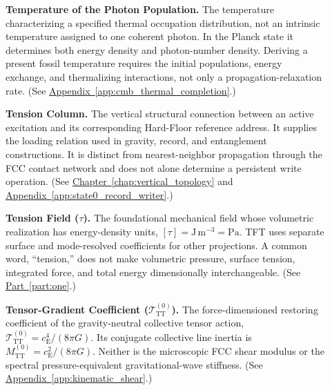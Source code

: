 \begin{description}
\item[] \begin{minipage}[t]{\linewidth}
\textbf{Temperature of the Photon Population.} The temperature characterizing a specified thermal occupation distribution, not an intrinsic temperature assigned to one coherent photon. In the Planck state it determines both energy density and photon-number density. Deriving a present fossil temperature requires the initial populations, energy exchange, and thermalizing interactions, not only a propagation-relaxation rate.
(See \hyperref[app:cmb_thermal_completion]{Appendix~\ref*{app:cmb_thermal_completion}}.)
\end{minipage}

\item[] \begin{minipage}[t]{\linewidth}
\textbf{Tension Column.} The vertical structural connection between an active excitation and its corresponding Hard-Floor reference address. It supplies the loading relation used in gravity, record, and entanglement constructions. It is distinct from nearest-neighbor propagation through the FCC contact network and does not alone determine a persistent write operation.
(See \hyperref[chap:vertical_topology]{Chapter~\ref*{chap:vertical_topology}} and \hyperref[app:state0_record_writer]{Appendix~\ref*{app:state0_record_writer}}.)
\end{minipage}

\item[] \begin{minipage}[t]{\linewidth}
\textbf{Tension Field ($\tau$).} The foundational mechanical field whose volumetric realization has energy-density units, $[\tau]=\mathrm{J\,m^{-3}}=\mathrm{Pa}$. TFT uses separate surface and mode-resolved coefficients for other projections. A common word, ``tension,'' does not make volumetric pressure, surface tension, integrated force, and total energy dimensionally interchangeable.
(See \hyperref[part:one]{Part~\ref*{part:one}}.)
\end{minipage}

\item[] \begin{minipage}[t]{\linewidth}
\textbf{Tensor-Gradient Coefficient ($\mathcal T_{\mathrm{TT}}^{(0)}$).} The force-dimensioned restoring coefficient of the gravity-neutral collective tensor action, $\mathcal T_{\mathrm{TT}}^{(0)}=c_{\mathrm E}^4/(8\pi G)$. Its conjugate collective line inertia is $M_{\mathrm{TT}}^{(0)}=c_{\mathrm E}^2/(8\pi G)$. Neither is the microscopic FCC shear modulus or the spectral pressure-equivalent gravitational-wave stiffness.
(See \hyperref[app:kinematic_shear]{Appendix~\ref*{app:kinematic_shear}}.)
\end{minipage}


\end{description}
